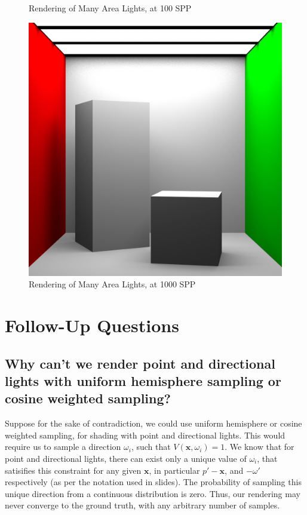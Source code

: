 \documentclass[a4paper]{myarticle}
\begin{document}
\begin{figure}[H]
\begin{minipage}[t]{.3\textwidth}
      \caption{Rendering of Many Area Lights, at 100 SPP}
  \end{minipage}
  \hfill
  \begin{minipage}[t]{.3\textwidth}
      \centering
      \includegraphics[width=\textwidth]{q3/many_2_1000.png}
      \caption{Rendering of Many Area Lights, at 1000 SPP}
  \end{minipage}
\end{figure}

\section{Follow-Up Questions}

\subsection{Why can't we render point and directional lights with uniform hemisphere sampling or cosine weighted sampling?}

Suppose for the sake of contradiction, we could use uniform hemisphere or cosine weighted sampling, for shading with point and directional lights. This would require us to sample a direction $\omega_i$, such that $V(\textbf{x}, \omega_i) = 1$. We know that for point and directional lights, there can exist only a unique value of $\omega_i$, that satisifies this constraint for any given $\textbf{x}$, in particular $p' - \textbf{x}$, and $-\omega'$ respectively (as per the notation used in slides). The probability of sampling this unique direction from a continuous distribution is zero. Thus, our rendering may never converge to the ground truth, with any arbitrary number of samples.
\end{document}
